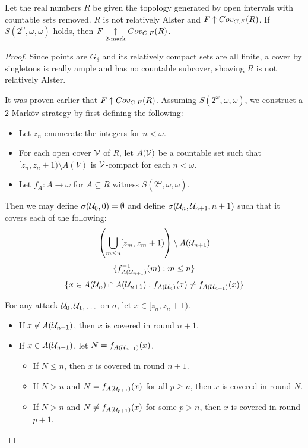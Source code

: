   \begin{example}
    Let the real numbers $R$ be given the topology generated by open intervals with countable sets removed. $R$ is not relatively Alster and $F\uparrow Cov_{C,F}(R)$. If $S(2^\omega,\omega,\omega)$ holds, then $F\underset{2\text{-mark}}{\uparrow}Cov_{C,F}(R)$.
  \end{example}

  \begin{proof}
    Since points are $G_\delta$ and its relatively compact sets are all finite, a cover by singletons is really ample and has no countable subcover, showing $R$ is not relatively Alster.

    It was proven earlier that $F\uparrow Cov_{C,F}(R)$. Assuming $S(2^\omega,\omega,\omega)$, we construct a $2$-Mark\"ov strategy by first defining the following:
      \begin{itemize}
        \item Let $z_n$ enumerate the integers for $n<\omega$.
        \item For each open cover $\mathcal{V}$ of $R$, let $A(\mathcal{V})$ be a countable set such that $[z_n,z_n+1)\setminus A(V)$ is $\mathcal{V}$-compact for each $n<\omega$.
        \item Let $f_A:A\to\omega$ for $A\subseteq R$ witness $S(2^\omega,\omega,\omega)$.
      \end{itemize}

    Then we may define $\sigma(\mathcal{U}_0,0)=\emptyset$ and define $\sigma(\mathcal{U}_n,\mathcal{U}_{n+1},n+1)$ such that it covers each of the following:
      \[
        \left(\bigcup_{m\leq n} [z_m,z_m+1)\right) \setminus A(\mathcal{U}_{n+1})
      \]
      \[
        \{f_{A(\mathcal{U}_{n+1})}^{-1}(m) : m\leq n\}
      \]
      \[
        \{x \in A(\mathcal{U}_n)\cap A(\mathcal{U}_{n+1}) : f_{A(\mathcal{U}_{n})}(x)\not= f_{A(\mathcal{U}_{n+1})}(x)\}
      \]

    For any attack $\mathcal{U}_0,\mathcal{U}_1,\dots$ on $\sigma$, let $x\in[z_n,z_n+1)$. 
      \begin{itemize}
        \item If $x\not\in A(\mathcal{U}_{n+1})$, then $x$ is covered in round $n+1$.
        \item If $x\in A(\mathcal{U}_{n+1})$, let $N=f_{A(\mathcal{U}_{n+1})}(x)$. 
        \begin{itemize}
          \item If $N\leq n$, then $x$ is covered in round $n+1$.
          \item If $N>n$ and $N=f_{A(\mathcal{U}_{p+1})}(x)$ for all $p\geq n$, then $x$ is covered in round $N$.
          \item If $N>n$ and $N\not=f_{A(\mathcal{U}_{p+1})}(x)$ for some $p>n$, then $x$ is covered in round $p+1$.
        \end{itemize}
      \end{itemize}
  \end{proof}

